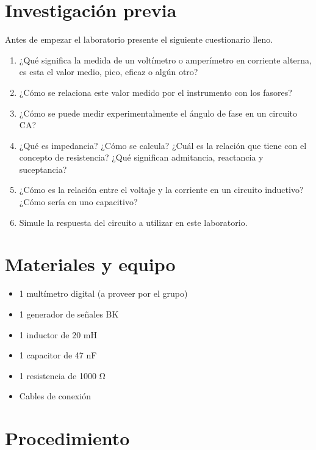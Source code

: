 \documentclass[12pt,letterpaper]{report}
\newcommand{\inv}{Investigación previa}
\newcommand{\mat}{Materiales y equipo}
\newcommand{\pro}{Procedimiento}
\newcommand{\antesde}{Antes de empezar el laboratorio presente el siguiente cuestionario lleno.}
\begin{document}
\section{\inv}
\antesde
\begin{enumerate}
\item ¿Qué significa la medida de un voltímetro o amperímetro en corriente alterna,
es esta el valor medio, pico, eficaz o algún otro?
\item ¿Cómo se relaciona este valor medido por el instrumento con los fasores?
\item ¿Cómo se puede medir experimentalmente el ángulo de fase en un circuito
CA?
\item ¿Qué es impedancia? ¿Cómo se calcula? ¿Cuál es la relación que tiene con
el concepto de resistencia? ¿Qué significan admitancia, reactancia y
suceptancia?
\item ¿Cómo es la relación entre el voltaje y la corriente en un circuito inductivo?
¿Cómo sería en uno capacitivo?
\item Simule la respuesta del circuito a utilizar en este laboratorio.
\end{enumerate}

\section{\mat}

\begin{itemize}
\item 1 multímetro digital (a proveer por el grupo)
\item 1 generador de señales BK
\item 1 inductor de 20 \si{\milli\henry}
\item 1 capacitor de 47 \si{\nano\farad}
\item 1 resistencia de 1000 \si{\ohm}
\item Cables de conexión
\end{itemize}

\section{\pro}
\end{document}
